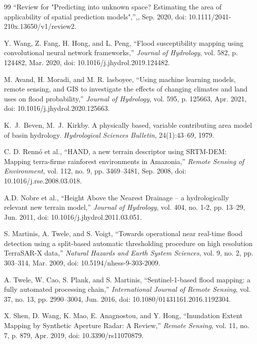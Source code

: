 \documentclass[10pt,twocolumn]{article}
\begin{document}
{\begin{thebibliography}{99}
``Review for "Predicting into unknown space? Estimating the area of applicability of spatial prediction models",'',, Sep. 2020, doi: 10.1111/2041-210x.13650/v1/review2.

Y. Wang, Z. Fang, H. Hong, and L. Peng, ``Flood susceptibility mapping using convolutional neural network frameworks,'' \emph{Journal of Hydrology}, vol. 582, p. 124482, Mar. 2020, doi: 10.1016/j.jhydrol.2019.124482.

M. Avand, H. Moradi, and M. R. lasboyee, ``Using machine learning models, remote sensing, and GIS to investigate the effects of changing climates and land uses on flood probability,'' \emph{Journal of Hydrology}, vol. 595, p. 125663, Apr. 2021, doi: 10.1016/j.jhydrol.2020.125663.

K.~J.~Beven, M.~J.~Kirkby. A physically based, variable contributing area model of basin hydrology. \emph{Hydrological Sciences Bulletin}, 24(1):43--69, 1979.

C. D. Rennó et al., ``HAND, a new terrain descriptor using SRTM-DEM: Mapping terra-firme rainforest environments in Amazonia,'' \emph{Remote Sensing of Environment}, vol. 112, no. 9, pp. 3469--3481, Sep. 2008, doi: 10.1016/j.rse.2008.03.018.

A.D. Nobre et al., ``Height Above the Nearest Drainage -- a hydrologically relevant new terrain model,'' \emph{Journal of Hydrology}, vol. 404, no. 1-2, pp. 13--29, Jun. 2011, doi: 10.1016/j.jhydrol.2011.03.051.

S. Martinis, A. Twele, and S. Voigt, ``Towards operational near real-time flood detection using a split-based automatic thresholding procedure on high resolution TerraSAR-X data,'' \emph{Natural Hazards and Earth System Sciences}, vol. 9, no. 2, pp. 303--314, Mar. 2009, doi: 10.5194/nhess-9-303-2009.

A. Twele, W. Cao, S. Plank, and S. Martinis, ``Sentinel-1-based flood mapping: a fully automated processing chain,'' \emph{International Journal of Remote Sensing}, vol. 37, no. 13, pp. 2990--3004, Jun. 2016, doi: 10.1080/01431161.2016.1192304.

X. Shen, D. Wang, K. Mao, E. Anagnostou, and Y. Hong, ``Inundation Extent Mapping by Synthetic Aperture Radar: A Review,'' \emph{Remote Sensing}, vol. 11, no. 7, p. 879, Apr. 2019, doi: 10.3390/rs11070879.


\end{thebibliography}}
\end{document}
